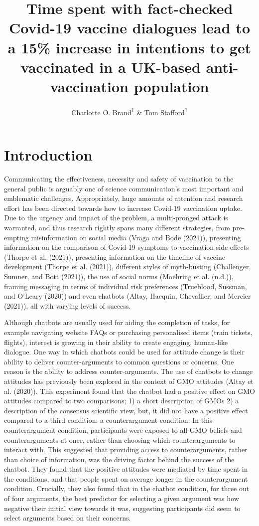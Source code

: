 \documentclass[
  english,
  ,jou,floatsintext]{apa6}
\title{Time spent with fact-checked Covid-19 vaccine dialogues lead to a 15\% increase in intentions to get vaccinated in a UK-based anti-vaccination population}
\author{Charlotte O. Brand\textsuperscript{1} \& Tom Stafford\textsuperscript{1}}
\date{}
\affiliation{\vspace{0.5cm}\textsuperscript{1} University of Sheffield, Department of Psychology}
\begin{document}
\maketitle

\hypertarget{introduction}{%
\section{Introduction}\label{introduction}}

Communicating the effectiveness, necessity and safety of vaccination to the general public is arguably one of science communication's most important and emblematic challenges. Appropriately, huge amounts of attention and research effort has been directed towards how to increase Covid-19 vaccination uptake. Due to the urgency and impact of the problem, a multi-pronged attack is warranted, and thus research rightly spans many different strategies, from pre-empting misinformation on social media (Vraga and Bode (2021)), presenting information on the comparison of Covid-19 symptoms to vaccination side-effects (Thorpe et al. (2021)), presenting information on the timeline of vaccine development (Thorpe et al. (2021)), different styles of myth-busting (Challenger, Sumner, and Bott (2021)), the use of social norms (Moehring et al. (n.d.)), framing messaging in terms of individual risk preferences (Trueblood, Sussman, and O'Leary (2020)) and even chatbots (Altay, Hacquin, Chevallier, and Mercier (2021)), all with varying levels of success.

Although chatbots are usually used for aiding the completion of tasks, for example navigating website FAQs or purchasing personalised items (train tickets, flights), interest is growing in their ability to create engaging, human-like dialogue. One way in which chatbots could be used for attitude change is their ability to deliver counter-arguments to common questions or concerns. One reason is the ability to address counter-arguments. The use of chatbots to change attitudes has previously been explored in the context of GMO attitudes (Altay et al. (2020)). This experiment found that the chatbot had a positive effect on GMO attitudes compared to two comparisons; 1) a short description of GMOs 2) a description of the consensus scientific view, but, it did not have a positive effect compared to a third condition: a counterargument condition. In this counterargument condition, participants were exposed to all GMO beliefs and counterarguments at once, rather than choosing which counterarguments to interact with. This suggested that providing access to counterarguments, rather than choice of information, was the driving factor behind the success of the chatbot. They found that the positive attitudes were mediated by time spent in the conditions, and that people spent on average longer in the counterargument condition. Crucially, they also found that in the chatbot condition, for three out of four arguments, the best predictor for selecting a given argument was how negative their initial view towards it was, suggesting participants did seem to select arguments based on their concerns.
\end{document}
